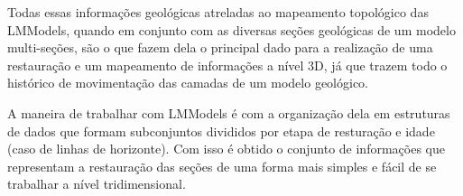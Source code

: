 Todas essas informações  geológicas atreladas ao mapeamento topológico das LMModels, quando em conjunto com as diversas seções geológicas de um modelo multi-seções, são o que fazem dela o principal dado para a realização de uma restauração e um mapeamento de informações a nível 3D, já que trazem todo o histórico de movimentação das camadas de um modelo geológico.

A maneira de trabalhar com LMModels é com a organização dela em estruturas de dados que formam subconjuntos divididos por etapa de resturação e idade (caso de linhas de horizonte). Com isso é obtido o conjunto de informações que representam a restauração das seções de uma forma mais simples e fácil de se trabalhar a nível tridimensional.


